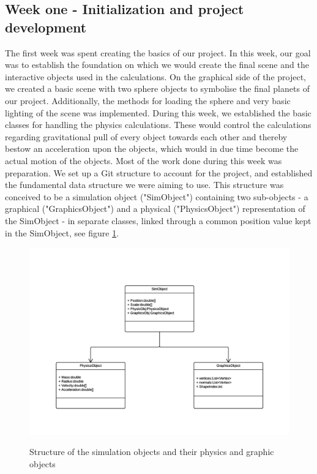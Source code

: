 \subsection{Week one - Initialization and project development}
The first week was spent creating the basics of our project. In this week, our goal was to establish the foundation on which we would create the final scene and the interactive objects used in the calculations. 
On the graphical side of the project, we created a basic scene with two sphere objects to symbolise the final planets of our project. Additionally, the methods for loading the sphere and very basic lighting of the scene was implemented.
During this week, we established the basic classes for handling the physics calculations. These would control the calculations regarding gravitational pull of every object towards each other and thereby bestow an acceleration upon the objects, which would in due time become the actual motion of the objects.
Most of the work done during this week was preparation. We set up a Git structure to account for the project, and established the fundamental data structure we were aiming to use. This structure was conceived to be a simulation object ("SimObject") containing two sub-objects - a graphical ("GraphicsObject") and a physical ("PhysicsObject") representation of the SimObject - in separate classes, linked through a common position value kept in the SimObject, see figure \ref{GraphicsObjects}.
\begin{figure}[h]
\centering
\includegraphics[scale=0.7]{GraphicsProjectObjects.png}
\label{GraphicsObjects}
\caption{Structure of the simulation objects and their physics and graphic objects}
\end{figure}

